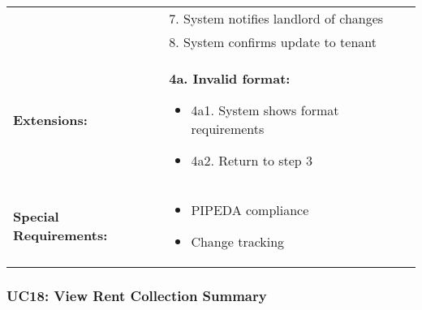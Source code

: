 \documentclass[12pt]{article}
\begin{document}
\begin{longtable}{|p{3cm}|p{11cm}|}
& 7. System notifies landlord of changes \\
& 8. System confirms update to tenant \\
\hline
\textbf{Extensions:} & 
\textbf{4a. Invalid format:}
\begin{itemize}
    \item 4a1. System shows format requirements
    \item 4a2. Return to step 3
\end{itemize} \\
\hline
\textbf{Special Requirements:} & 
\begin{itemize}
    \item PIPEDA compliance
    \item Change tracking
\end{itemize} \\
\hline
\end{longtable}


\subsubsection{UC18: View Rent Collection Summary}
\end{document}
